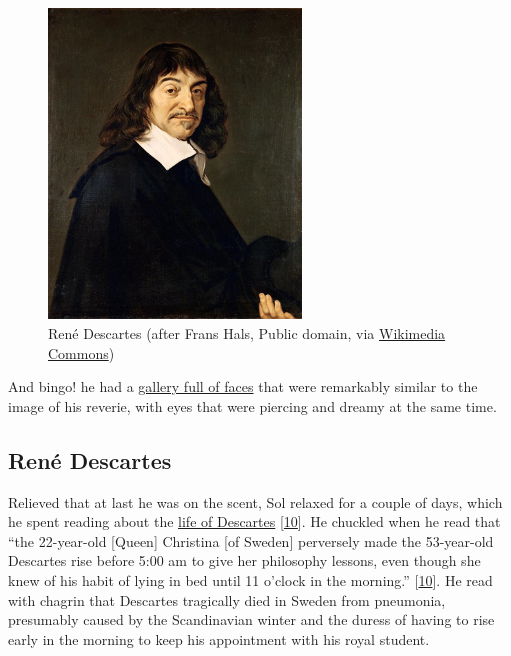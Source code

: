 \documentclass[
  a4paper,
]{article}
\begin{document}
\begin{figure}
\centering
\includegraphics[width=0.6\textwidth,height=\textheight]{images/rene-descartes.jpg}
\caption{René Descartes (after Frans Hals, Public domain, via
\href{https://commons.wikimedia.org/wiki/File:Frans_Hals_-_Portret_van_Ren\%C3\%A9_Descartes.jpg}{Wikimedia
Commons})}
\end{figure}

And bingo! he had a \href{https://tinyurl.com/y57nykjd}{gallery full of
faces} that were remarkably similar to the image of his reverie, with
eyes that were piercing and dreamy at the same time.

\hypertarget{renuxe9-descartes}{%
\subsection{René Descartes}\label{renuxe9-descartes}}

Relieved that at last he was on the scent, Sol relaxed for a couple of
days, which he spent reading about the
\href{https://www.britannica.com/biography/Rene-Descartes}{life of
Descartes} {[}\protect\hyperlink{ref-watson2020}{10}{]}. He chuckled
when he read that ``the 22-year-old {[}Queen{]} Christina {[}of
Sweden{]} perversely made the 53-year-old Descartes rise before 5:00 am
to give her philosophy lessons, even though she knew of his habit of
lying in bed until 11 o'clock in the morning.''
{[}\protect\hyperlink{ref-watson2020}{10}{]}. He read with chagrin that
Descartes tragically died in Sweden from pneumonia, presumably caused by
the Scandinavian winter and the duress of having to rise early in the
morning to keep his appointment with his royal student.
\end{document}
